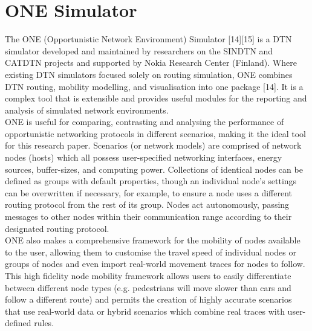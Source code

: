 \documentclass{article}
\begin{document}
\section{ONE Simulator}
The ONE (Opportunistic Network Environment) Simulator [14][15] is a DTN simulator developed and maintained by researchers on the SINDTN and CATDTN projects and supported by Nokia Research Center (Finland). Where existing DTN simulators focused solely on routing simulation, ONE combines DTN routing, mobility modelling, and visualisation into one package [14]. It is a complex tool that is extensible and provides useful modules for the reporting and analysis of simulated network environments.\\
\newline ONE is useful for comparing, contrasting and analysing the performance of opportunistic networking protocols in different scenarios, making it the ideal tool for this research paper. Scenarios (or network models) are comprised of network nodes (hosts) which all possess user-specified networking interfaces, energy sources, buffer-sizes, and computing power. Collections of identical nodes can be defined as groups with default properties, though an individual node's settings can be overwritten if necessary, for example, to ensure a node uses a different routing protocol from the rest of its group. Nodes act autonomously, passing messages to other nodes within their communication range according to their designated routing protocol.\\ 
\newline ONE also makes a comprehensive framework for the mobility of nodes available to the user, allowing them to customise the travel speed of individual nodes or groups of nodes and even import real-world movement traces for nodes to follow. This high fidelity node mobility framework allows users to easily differentiate between different node types (e.g. pedestrians will move slower than cars and follow a different route) and permits the creation of highly accurate scenarios that use real-world data or hybrid scenarios which combine real traces with user-defined rules.\\
\end{document}
